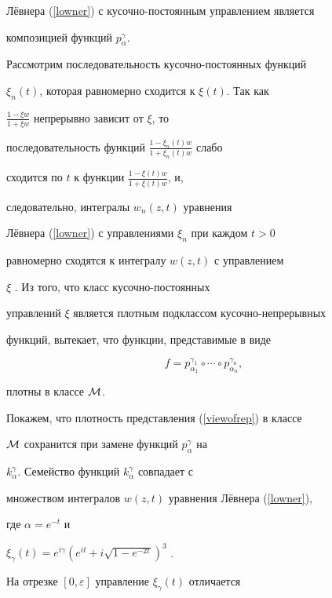 Л\"евнера (\ref{lowner}) с кусочно-постоянным управлением является


композицией функций $p_\alpha^\gamma$.





Рассмотрим последовательность кусочно-постоянных функций


$\xi_{n}(t)$, которая равномерно сходится к $\xi(t)$. Так как


$\frac{1-\xi w}{1+\xi w}$ непрерывно зависит от $\xi$, то


последовательность функций $\frac{1-\xi_n(t)w}{1+\xi_n(t)w}$ слабо


сходится по $t$ к функции $\frac{1-\xi(t) w}{1+\xi(t) w}$, и,


следовательно, интегралы $w_n(z,t)$ уравнения


Л\"евнера (\ref{lowner}) с управлениями $\xi_n$ при каждом $t>0$


равномерно сходятся к интегралу $w(z,t)$ с управлением


$\xi$ \cite{Gorainov}. Из того, что класс кусочно-постоянных


управлений $\xi$ является плотным подклассом кусочно-непрерывных


функций, вытекает, что функции, представимые в виде


\begin{equation}


\label{viewofrep}


f=p_{\alpha_1}^{\gamma_1}\circ\dotsb\circ


p_{\alpha_n}^{\gamma_n},


\end{equation}


плотны в классе $\cal M$.





Покажем, что плотность представления (\ref{viewofrep}) в классе


$\cal M$ сохранится при замене функций $p_\alpha^\gamma$ на


$k_\alpha^\gamma$. Семейство функций $k_\alpha^\gamma$ совпадает с


множеством интегралов $w(z,t)$ уравнения Л\"евнера (\ref{lowner}),


где $\alpha=e^{-t}$ и


$\xi_\gamma(t)=e^{i\gamma}(e^{it}+i\sqrt{1-e^{-2t}})^3$ \cite{Kufarev}.


На отрезке $[0,\varepsilon]$ управление $\xi_\gamma(t)$ отличается


